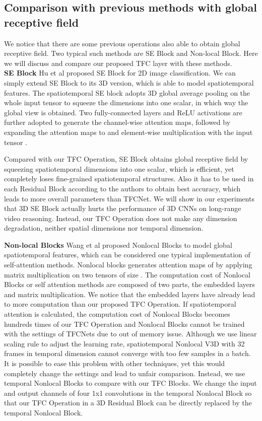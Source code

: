 \documentclass[nohyperref]{article}
\theoremstyle{plain}
\theoremstyle{definition}
\theoremstyle{remark}
\begin{document}
{{\subsection{Comparison with previous methods with global receptive field}
We notice that there are some previous operations also able to obtain global receptive field. Two typical such methods are SE Block and Non-local Block. Here we will discuss and compare our proposed TFC layer with these methods.\\
{\bf SE Block } Hu et al \cite{Hu_2018_CVPR} proposed SE Block for 2D image classification. We can simply extend SE Block to its 3D version, which is able to model spatiotemporal features.  The spatiotemporal SE block adopts 3D global average pooling on the whole input tensor  to squeeze the  dimensions into one scalar, in which way the global view is obtained. Two fully-connected layers and ReLU activations are further adopted to generate the channel-wise attention maps, followed by expanding the  attention maps to  and element-wise multiplication with the input tensor .


Compared with our TFC Operation, SE Block obtains global receptive field by squeezing spatiotemporal dimensions into one scalar, which is efficient, yet completely loses fine-grained spatiotemporal structures. Also it has to be used in each Residual Block according to the authors to obtain best accuracy, which leads to more overall parameters than TFCNet. We will show in our experiments that 3D SE Block actually hurts the performance of 3D CNNs on long-range video reasoning. Instead, our TFC Operation does not make any dimension degradation, neither spatial dimensions nor temporal dimension.


{\bf Non-local Blocks} Wang et al \cite{DBLP:conf/cvpr/0004GGH18}proposed Nonlocal Blocks to model global spatiotemporal features, which can be considered one typical implementation of self-attention methods. Nonlocal blocks generates attention maps of  by applying matrix multiplication on two tensors of size . The computation cost of Nonlocal Blocks or self attention methods are composed of two parts, the embedded layers and matrix multiplication. We notice that the embedded layers have already lead to  more computation than our proposed TFC Operation.  If spatiotemporal attention is calculated, the computation cost of Nonlocal Blocks becomes hundreds times of our TFC Operation and Nonlocal Blocks cannot be trained with the settings of TFCNets due to out of memory issue. Although we use linear scaling rule \cite{DBLP:journals/corr/GoyalDGNWKTJH17} to adjust the learning rate, spatiotemporal Nonlocal V3D with 32 frames in temporal dimension cannot converge with too few samples in a batch. It is possible to ease this problem with other techniques, yet this would completely change the settings and lead to unfair comparison. Instead, we use temporal Nonlocal Blocks to compare with our TFC Blocks. We change the input and output channels of four 1x1 convolutions in the temporal Nonlocal Block so that our TFC Operation in a 3D Residual Block can be directly replaced by the temporal Nonlocal Block.

}}
\end{document}
